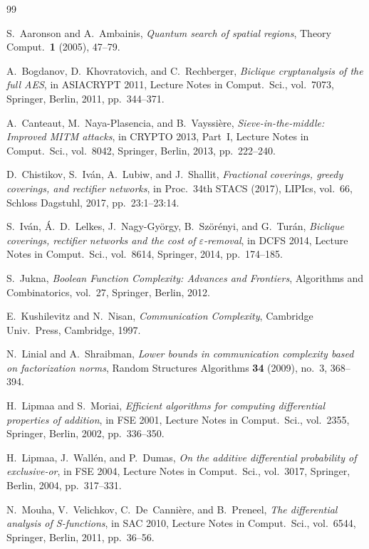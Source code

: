 \documentclass[11pt,reqno]{amsart}
\theoremstyle{definition}
\theoremstyle{remark}
\numberwithin{equation}{section}
\begin{document}
\begin{thebibliography}{99}

 S.~Aaronson and A.~Ambainis, \emph{Quantum search of spatial regions}, Theory Comput.\ \textbf{1} (2005), 47--79.

 A.~Bogdanov, D.~Khovratovich, and C.~Rechberger, \emph{Biclique cryptanalysis of the full AES}, in ASIACRYPT 2011, Lecture Notes in Comput.\ Sci., vol.~7073, Springer, Berlin, 2011, pp.~344--371.

 A.~Canteaut, M.~Naya-Plasencia, and B.~Vayssi\`ere, \emph{Sieve-in-the-middle: Improved MITM attacks}, in CRYPTO 2013, Part~I, Lecture Notes in Comput.\ Sci., vol.~8042, Springer, Berlin, 2013, pp.~222--240.

 D.~Chistikov, S.~Iv\'an, A.~Lubiw, and J.~Shallit, \emph{Fractional coverings, greedy coverings, and rectifier networks}, in Proc.\ 34th STACS (2017), LIPIcs, vol.~66, Schloss Dagstuhl, 2017, pp.~23:1--23:14.

 S.~Iv\'an, \'A.~D.~Lelkes, J.~Nagy-Gy\"orgy, B.~Sz\"or\'enyi, and G.~Tur\'an, \emph{Biclique coverings, rectifier networks and the cost of $\varepsilon$-removal}, in DCFS 2014, Lecture Notes in Comput.\ Sci., vol.~8614, Springer, 2014, pp.~174--185.

 S.~Jukna, \emph{Boolean Function Complexity: Advances and Frontiers}, Algorithms and Combinatorics, vol.~27, Springer, Berlin, 2012.

 E.~Kushilevitz and N.~Nisan, \emph{Communication Complexity}, Cambridge Univ.\ Press, Cambridge, 1997.

 N.~Linial and A.~Shraibman, \emph{Lower bounds in communication complexity based on factorization norms}, Random Structures Algorithms \textbf{34} (2009), no.~3, 368--394.

 H.~Lipmaa and S.~Moriai, \emph{Efficient algorithms for computing differential properties of addition}, in FSE 2001, Lecture Notes in Comput.\ Sci., vol.~2355, Springer, Berlin, 2002, pp.~336--350.

 H.~Lipmaa, J.~Wall\'en, and P.~Dumas, \emph{On the additive differential probability of exclusive-or}, in FSE 2004, Lecture Notes in Comput.\ Sci., vol.~3017, Springer, Berlin, 2004, pp.~317--331.

 N.~Mouha, V.~Velichkov, C.~De~Canni\`ere, and B.~Preneel, \emph{The differential analysis of S-functions}, in SAC 2010, Lecture Notes in Comput.\ Sci., vol.~6544, Springer, Berlin, 2011, pp.~36--56.


\end{thebibliography}
\end{document}
